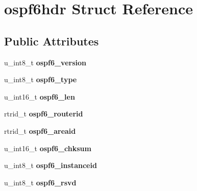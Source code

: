 \hypertarget{structospf6hdr}{
\section{ospf6hdr Struct Reference}
\label{structospf6hdr}
}
\subsection*{Public Attributes}
\begin{DoxyCompactItemize}
\item 
\hypertarget{structospf6hdr_adc587016422c154390501702d7f04113}{
u\_\-int8\_\-t {\bfseries ospf6\_\-version}}
\label{structospf6hdr_adc587016422c154390501702d7f04113}

\item 
\hypertarget{structospf6hdr_a6f25c60497b39c5633e79a34c3cb0b7d}{
u\_\-int8\_\-t {\bfseries ospf6\_\-type}}
\label{structospf6hdr_a6f25c60497b39c5633e79a34c3cb0b7d}

\item 
\hypertarget{structospf6hdr_a7307021fe66b4d686b52879f2fbb41bd}{
u\_\-int16\_\-t {\bfseries ospf6\_\-len}}
\label{structospf6hdr_a7307021fe66b4d686b52879f2fbb41bd}

\item 
\hypertarget{structospf6hdr_a776bf41e31c4f0650bd77e7213bf5dbe}{
rtrid\_\-t {\bfseries ospf6\_\-routerid}}
\label{structospf6hdr_a776bf41e31c4f0650bd77e7213bf5dbe}

\item 
\hypertarget{structospf6hdr_ab02344248325b8f4653528c51dcdfdc7}{
rtrid\_\-t {\bfseries ospf6\_\-areaid}}
\label{structospf6hdr_ab02344248325b8f4653528c51dcdfdc7}

\item 
\hypertarget{structospf6hdr_ae45d752382abbec72ecb250e3d8931ac}{
u\_\-int16\_\-t {\bfseries ospf6\_\-chksum}}
\label{structospf6hdr_ae45d752382abbec72ecb250e3d8931ac}

\item 
\hypertarget{structospf6hdr_a664fe75cbf45b732811301e195f9f1d9}{
u\_\-int8\_\-t {\bfseries ospf6\_\-instanceid}}
\label{structospf6hdr_a664fe75cbf45b732811301e195f9f1d9}

\item 
\hypertarget{structospf6hdr_a1d3f50285adebfa52b20883df2db4aff}{
u\_\-int8\_\-t {\bfseries ospf6\_\-rsvd}}
\label{structospf6hdr_a1d3f50285adebfa52b20883df2db4aff}


\end{DoxyCompactItemize}
